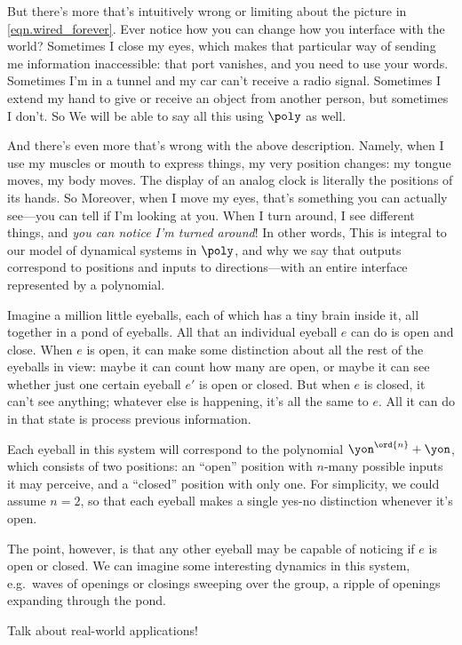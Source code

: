 But there's more that's intuitively wrong or limiting about the picture in \eqref{eqn.wired_forever}. Ever notice how you can change how you interface with the world? Sometimes I close my eyes, which makes that particular way of sending me information inaccessible: that port vanishes, and you need to use your words. Sometimes I'm in a tunnel and my car can't receive a radio signal. Sometimes I extend my hand to give or receive an object from another person, but sometimes I don't. So
We will be able to say all this using $\poly$ as well.

And there's even more that's wrong with the above description.
Namely, when I use my muscles or mouth to express things, my very position changes: my tongue moves, my body moves.
The display of an analog clock is literally the positions of its hands.
So
Moreover, when I move my eyes, that's something you can actually see---you can tell if I'm looking at you.
When I turn around, I see different things, and \emph{you can notice I'm turned around}!
In other words,
This is integral to our model of dynamical systems in $\poly$, and why we say that outputs correspond to positions and inputs to directions---with an entire interface represented by a polynomial.

\begin{example}\label{ex.pond_eyeballs}
    Imagine a million little eyeballs, each of which has a tiny brain inside it, all together in a pond of eyeballs. All that an individual eyeball $e$ can do is open and close. When $e$ is open, it can make some distinction about all the rest of the eyeballs in view: maybe it can count how many are open, or maybe it can see whether just one certain eyeball $e'$ is open or closed. But when $e$ is closed, it can't see anything; whatever else is happening, it's all the same to $e$. All it can do in that state is process previous information.

    Each eyeball in this system will correspond to the polynomial $\yon^\ord{n}+\yon$, which consists of two positions: an ``open'' position with $n$-many possible inputs it may perceive, and a ``closed'' position with only one. For simplicity, we could assume $n=2$, so that each eyeball makes a single yes-no distinction whenever it's open.

    The point, however, is that any other eyeball may be capable of noticing if $e$ is open or closed. We can imagine some interesting dynamics in this system, e.g.\ waves of openings or closings sweeping over the group, a ripple of openings expanding through the pond.

    Talk about real-world applications!
\end{example}

